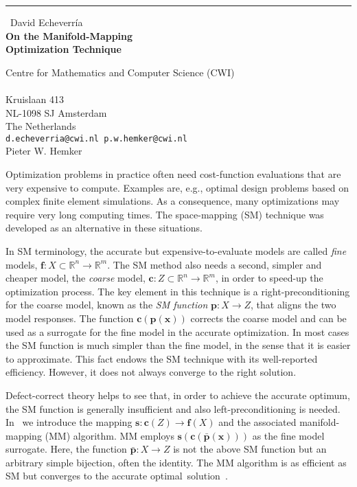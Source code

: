 \documentclass{report}
\begin{document}
\begin{center}
\rule{6in}{1pt} \
{\large David Echeverr\'{i}a \\
{\bf On the Manifold-Mapping \\Optimization Technique}}

Centre for Mathematics and Computer Science (CWI)\\ \\ Kruislaan 413 \\ NL-1098 SJ Amsterdam \\ The Netherlands
\\
{\tt d.echeverria@cwi.nl p.w.hemker@cwi.nl}\\
Pieter W. Hemker\end{center}

\newcommand{\ff}{{\mathbf f}}
\newcommand{\pp}{{\mathbf p}}
\newcommand{\ppb}{\bar{{\mathbf p}}}
\newcommand{\xx}{{\mathbf x}}
\renewcommand{\ss}{{\mathbf s}}
\newcommand{\yy}{{\mathbf y}}
\newcommand{\cc}{{\mathbf c}}
\newcommand{\RR}{\ensuremath{\mathbb{R}}}
\thispagestyle{empty}

Optimization problems in practice often need cost-function
evaluations that are very expensive to compute. Examples are, e.g.,
optimal design problems based on complex finite element simulations.
As a consequence, many optimizations may require very long computing
times. The space-mapping (SM) technique \cite{smlist010,survey2004}
was developed as an alternative in these situations.

In SM terminology, the accurate but expensive-to-evaluate models are
called {\it fine} models, \mbox{$\ff:X \subset \RR^n \to \RR^m$}. The
SM method also needs a second, simpler and cheaper
model, the {\it
coarse} model, \mbox{$\cc:Z \subset \RR^n \to \RR^m$}, in order to
speed-up the optimization process. The key element in this technique
is a right-preconditioning for the coarse model, known as the {\it SM function}
\mbox{$\pp:X \to Z$}, that aligns the two model responses. The
function $\cc(\pp(\xx))$ corrects the coarse model and can be used
as a surrogate for the fine model in the accurate optimization. In
most cases the SM function is much simpler than the fine model, in
the sense that it is easier to approximate. This fact endows the SM
technique with its well-reported efficiency. However, it does not always
converge to the right solution.

Defect-correct theory \cite{dcp} helps to see that, in order to
achieve the accurate optimum, the SM function is generally
insufficient and also left-preconditioning is needed. \mbox{In
\cite{paper01}} we introduce the mapping \mbox{$\ss:\cc(Z) \to
\ff(X)$} and the associated manifold-mapping (MM) algorithm. MM
employs $\ss(\cc(\ppb(\xx)))$ as the fine model surrogate.
Here, the function $\ppb:X \to Z$ is not the above SM function
but an arbitrary simple bijection, often the identity. The MM algorithm is as
efficient as SM but converges to the accurate \mbox{optimal solution
\cite{paper01,paper02}}.
\end{document}
